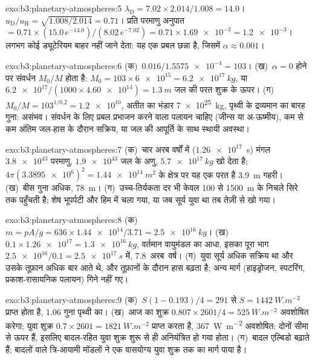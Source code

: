\begin{solution}{exo:b3:planetary-atmospheres:5}
$\lambda_\mathrm D = 7.02\times2.014/1.008 = 14.0$। $u_\mathrm D/u_\mathrm H
= \sqrt{1.008/2.014} = 0.71$। प्रति परमाणु अनुपात $= 0.71\times(15.0\,
e^{-14.0})/(8.02\,e^{-7.02}) = 0.71\times\num{1.69e-3} = \num{1.2e-3}$।
 लगभग कोई ड्यूटेरियम बाहर नहीं जाने देता: यह एक प्रबल छन्ना है, जिसमें
$\alpha \approx 0.001$।
\end{solution}

\begin{solution}{exo:b3:planetary-atmospheres:6}
(क)~$0.016/\num{1.5575e-4} = 103$। (ख)~$\alpha = 0$ होने पर संवर्धन
$M_0/M$ होता है: $M_0 = 103\times\num{6e15} = \qty{6.2e17}{kg}$, या
$\num{6.2e17}/(1000\times\num{4.60e14}) = \qty{1.3}{m}$ जल की परत
शुक्र के ऊपर। (ग)~$M_0/M = 103^{1/0.2} = \num{1.2e10}$, अतीत का भंडार
\qty{7e25}{kg}, पृथ्वी के द्रव्यमान का बारह गुना: असंभव। संवर्धन के लिए
प्रबल प्रभाजन करने वाला पलायन चाहिए (जीन्स या अ-ऊष्मीय),
कम से कम अंतिम जल-हास के दौरान सक्रिय, या
जल की आपूर्ति के साथ स्थायी अवस्था।
\end{solution}

\begin{solution}{exo:b3:planetary-atmospheres:7}
(क)~चार अरब वर्षों में ($\num{1.26e17}$~s) मंगल
$\num{3.8e43}$ परमाणु, $\num{1.9e43}$ जल के अणु, $\qty{5.7e17}{kg}$ खो देता है;
$4\pi(\num{3.3895e6})^2 = \qty{1.44e14}{m^2}$ के क्षेत्र पर यह एक परत है
\qty{3.9}{m} गहरी। (ख)~बीस गुना अधिक, \qty{78}{m}। (ग)~उच्च-तिर्यकता दर भी
केवल 100 से
\qty{1500}{m} के निचले सिरे तक पहुँचती है; शेष भूपर्पटी और हिम में चला गया, या
जब सूर्य युवा था तब तेज़ी से खो गया।
\end{solution}

\begin{solution}{exo:b3:planetary-atmospheres:8}
(क)~$m = pA/g = 636\times\num{1.44e14}/3.71 = \qty{2.5e16}{kg}$।
(ख)~$0.1\times\num{1.26e17} = \qty{1.3e16}{kg}$, वर्तमान वायुमंडल का आधा,
इसका पूरा भाग $\num{2.5e16}/0.1 = \qty{2.5e17}{s}$ में,
\num{7.8}~अरब~वर्ष। (ग)~युवा सूर्य अधिक सक्रिय था और उसके
तूफ़ान अधिक बार आते थे, और तूफ़ानों के दौरान हास बढ़ता है; अन्य मार्ग
(हाइड्रोजन, स्पटरिंग, प्रकाश-रासायनिक पलायन) गिने नहीं गए।
\end{solution}

\begin{solution}{exo:b3:planetary-atmospheres:9}
(क)~$S(1 - 0.193)/4 = 291$ से $S = \qty{1442}{W.m^{-2}}$ प्राप्त होता है, 1.06 गुना
पृथ्वी का। (ख)~आज का शुक्र $0.807\times2601/4 =
\qty{525}{W.m^{-2}}$ अवशोषित करेगा; युवा शुक्र $0.7\times2601 = \qty{1821}{W.m^{-2}}$
प्राप्त करता है, \qty{367}{W.m^{-2}} अवशोषित: दोनों सीमा से ऊपर हैं, इसलिए बादल-रहित युवा शुक्र
शुरू से ही अनियंत्रित हो गया होता। (ग)~बादल
एल्बिडो बढ़ाते हैं; बादलों वाले त्रि-आयामी मॉडलों ने
एक वासयोग्य युवा शुक्र तक का मार्ग पाया है।
\end{solution}

